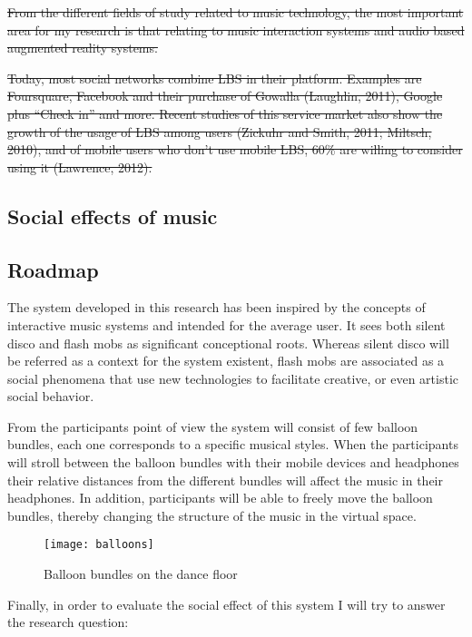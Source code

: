 \st{From the different fields of study related to music technology, the most important area for my research is that relating to music interaction systems and audio based augmented reality systems.}

\st{Today, most social networks combine LBS in their platform. Examples are Foursquare, Facebook and their purchase of Gowalla (Laughlin, 2011), Google plus ``Check in'' and more. Recent studies of this service market also show the growth of the usage of LBS among users (Zickuhr and Smith, 2011; Miltsch, 2010), and of mobile users who don't use mobile LBS, 60\% are willing to consider using it (Lawrence, 2012).}

\subsection{Social effects of music}


\subsection{Roadmap}\label{roadmap}


The system developed in this research has been inspired by the concepts of interactive music systems and intended for the average user. It sees both silent disco and flash mobs as significant conceptional roots. Whereas silent disco will be referred as a context for the system existent, flash mobs are associated as a social phenomena that use new technologies to facilitate creative, or even artistic social behavior.

From the participants point of view the system will consist of few balloon bundles, each one corresponds to a specific musical styles. When the participants will stroll between the balloon bundles with their mobile devices and headphones their relative distances from the different bundles will affect the music in their headphones. In addition, participants will be able to freely move the balloon bundles, thereby changing the structure of the music in the virtual space.

\begin{figure}[h]
	\texttt{[image: balloons]}
	\caption{Balloon bundles on the dance floor}
\end{figure}

Finally, in order to evaluate the social effect of this system I will try to answer the research question: \emph{\reserchquestion}